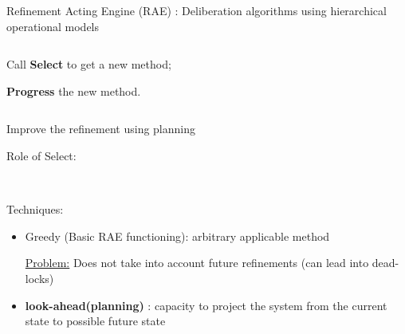 \begin{frame}{Refinement Acting Engine (RAE)\cite{ghallabAutomatedPlanningActing2016} : Deliberation algorithms using hierarchical operational models}
\begin{columns}
\begin{column}{0.65\textwidth}
\begin{itemize}
\begin{itemize}
                Call \textbf{Select} to get a new method;
                
                \textbf{Progress} the new method.
                \end{itemize}
                \pause
        \end{itemize}
    \end{column}
\end{columns}

    
\end{frame}

\begin{frame}{Improve the refinement using planning}
    \begin{center}
        
    Role of Select:

    ~

    

    \end{center}

    \pause
    Techniques:
    \begin{itemize}

    \item Greedy (Basic RAE functioning): arbitrary applicable method
    \pause
    
    \underline{Problem:} Does not take into account future refinements (can lead into dead-locks)
    \pause
    \item \textbf{look-ahead(planning)} : capacity to project the system from the current state to possible future state

    \end{itemize}
\end{frame}
